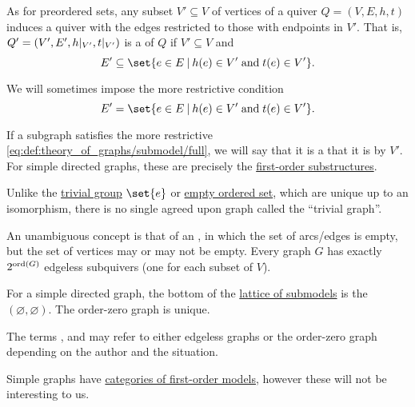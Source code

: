 \begin{definition}
\begin{thmenum}
     As for preordered sets, any subset \( V' \subseteq V \) of vertices of a quiver \( Q = (V, E, h, t) \) induces a quiver with the edges restricted to those with endpoints in \( V' \). That is, \( Q' = (V', E', h\vert_{V'}, t\vert_{V'}) \) is a  of \( Q \) if \( V' \subseteq V \) and
    \begin{equation}\label{eq:def:theory_of_graphs/submodel}
      E' \subseteq \set{ e \in E \given h(e) \in V' \T{and} t(e) \in V' }.
    \end{equation}

    We will sometimes impose the more restrictive condition
    \begin{equation}\label{eq:def:theory_of_graphs/submodel/full}
      E' = \set{ e \in E \given h(e) \in V' \T{and} t(e) \in V' }.
    \end{equation}

    If a subgraph satisfies the more restrictive \eqref{eq:def:theory_of_graphs/submodel/full}, we will say that it is a  that it is  by \( V' \). For simple directed graphs, these are precisely the \hyperref[def:first_order_substructure]{first-order substructures}.

     Unlike the \hyperref[def:group/trivial]{trivial group} \( \set{ e } \) or \hyperref[def:partially_ordered_set/trivial]{empty ordered set}, which are unique up to an isomorphism, there is no single agreed upon graph called the \enquote{trivial graph}.

    An unambiguous concept is that of an , in which the set of arcs/edges is empty, but the set of vertices may or may not be empty. Every graph \( G \) has exactly \( 2^{\operatorname{ord}(G)} \) edgeless subquivers (one for each subset of \( V \)).

    For a simple directed graph, the bottom of the \hyperref[thm:substructures_form_complete_lattice]{lattice of submodels} is the  \( (\varnothing, \varnothing) \). The order-zero graph is unique.

    The terms ,  and  may refer to either edgeless graphs or the order-zero graph depending on the author and the situation.

     Simple graphs have \hyperref[def:category_of_small_first_order_models]{categories of first-order models}, however these will not be interesting to us.


\end{thmenum}
\end{definition}

